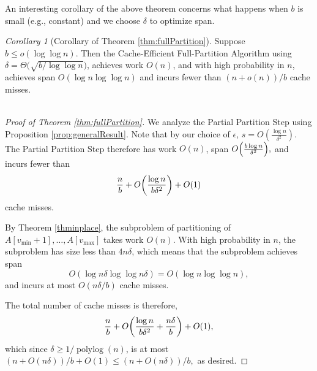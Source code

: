 \documentclass[sigplan, 10pt, nonacm]{acmart}
\DeclarePairedDelimiter{\paren}{(}{)}
\newcommand{\polylog}{\operatorname{polylog}}
\theoremstyle{remark}
\newtheorem{corollary}[thm]{Corollary}
\theoremstyle{remark}
\begin{document}

An interesting corollary of the above theorem concerns what happens when $b$ is small (e.g., constant) and we choose $\delta$ to optimize span. 

\begin{corollary}[Corollary of Theorem \ref{thm:fullPartition}]
	\label{cor:fullPartition}
Suppose $b \le o(\log \log n)$. Then the Cache-Efficient Full-Partition Algorithm using $\delta = \Theta\big(\sqrt{b/\log\log n}\big)$, achieves work $O(n)$, and with high probability in $n$, achieves span $O(\log n \log\log n)$ and incurs fewer than $(n+o(n))/b$ cache misses.\\\\
\end{corollary}

\begin{proof}[Proof of Theorem \ref{thm:fullPartition}]
  
  We analyze the Partial Partition Step using Proposition
  \ref{prop:generalResult}. Note that by our choice of $\epsilon$,
  $s=O\left(\frac{\log n}{\delta^2}\right)$.  The Partial Partition
  Step therefore has work $O(n)$, span $O\paren*{\frac{b\log
      n}{\delta^2}},$ and incurs fewer than
	$$\frac{n}{b}+O\paren*{\frac{\log n}{b\delta^2}}+O(1)$$ 
  cache misses.

  By Theorem \ref{thminplace}, the subproblem of partitioning of \\ $A[v_{\text{min}} + 1], \ldots,
   A[v_{\text{max}}]$ takes work $O(n)$. With high probability in $n$,
  the subproblem has size less than $4n\delta$, which means that the subproblem
  achieves span
  $$O(\log n\delta \log\log n\delta) = O(\log n \log\log n),$$
  and incurs at most $O(n \delta / b)$ cache misses.

  The total number of cache misses is therefore,
  	$$\frac{n}{b}+O\paren*{\frac{\log n}{b\delta^2} +
    \frac{n\delta}{b}}+O(1),$$ which since $\delta \ge 1 /
  \polylog(n)$, is at most $(n+O(n\delta))/b + O(1) \le (n + O(n
  \delta)) / b,$ as desired.
\end{proof}
\end{document}
